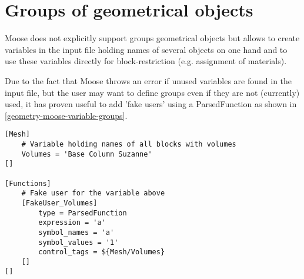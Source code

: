 \section{Groups of geometrical objects}
\label{geometry-groups}

Moose does not explicitly support groups geometrical objects but allows to
create variables in the input file holding names of several objects on one hand
and to use these variables directly for block-restriction (e.g. assignment of
materials).

Due to the fact that Moose throws an error if unused variables are found in the
input file, but the user may want to define groups even if they are not
(currently) used, it has proven useful to add 'fake users' using a
ParsedFunction as shown in \autoref{geometry-moose-variable-groups}.

\begin{lstlisting}[language=Moose, float, caption={Moose input file fragment: variable holding several block names and fake-user},label={geometry-moose-variable-groups}]
[Mesh]
    # Variable holding names of all blocks with volumes
    Volumes = 'Base Column Suzanne'
[]

[Functions]
    # Fake user for the variable above
    [FakeUser_Volumes]
        type = ParsedFunction
        expression = 'a'
        symbol_names = 'a'
        symbol_values = '1'
        control_tags = ${Mesh/Volumes}
    []
[]
\end{lstlisting}
